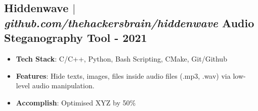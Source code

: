 \documentclass[11pt]{article} %
\begin{document}
\subsection{Hiddenwave $|$ \normalfont\textit{github.com/thehackersbrain/hiddenwave} \hfill Audio Steganography Tool - \textbf{2021}}
\vspace{3pt}
\begin{itemize}
  \item \textbf{Tech Stack}: C/C++, Python, Bash Scripting, CMake, Git/Github
  \item \textbf{Features}: Hide texts, images, files inside audio files (.mp3, .wav) via low-level audio manipulation.
  \item \textbf{Accomplish}: Optimised XYZ by 50\%
\end{itemize}
\end{document}

